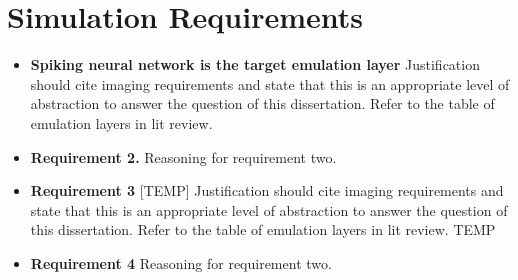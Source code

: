 \section{Simulation Requirements}

\begin{itemize}
    \item \textbf{Spiking neural network is the target emulation layer}
    Justification should cite imaging requirements and state that this is an
    appropriate level of abstraction to answer the question of this
    dissertation. Refer to the table of emulation layers in lit review.
    \item \textbf{Requirement 2.} Reasoning for requirement two.
    \item \textbf{Requirement 3}
    [TEMP] Justification should cite imaging requirements and state that this is an
    appropriate level of abstraction to answer the question of this
    dissertation. Refer to the table of emulation layers in lit review. TEMP
    \item \textbf{Requirement 4} Reasoning for requirement two.
\end{itemize}